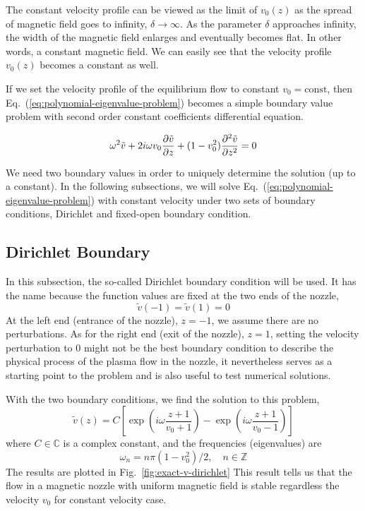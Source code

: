 The constant velocity profile can be viewed as the limit of $v_0(z)$ as the spread of magnetic field goes to infinity, $\delta\to\infty$. As the parameter $\delta$ approaches infinity, the width of the magnetic field enlarges and eventually becomes flat. In other words, a constant magnetic field. We can easily see that the velocity profile $v_0(z)$ becomes a constant as well.

If we set the velocity profile of the equilibrium flow to constant $v_0=\text{const}$, then Eq.~(\ref{eq:polynomial-eigenvalue-problem}) becomes a simple boundary value problem with second order constant coefficients differential equation.

\begin{equation} \label{eq:constant-v-problem-dirichlet}
	\omega^2\tilde{v} + 2i\omega v_0\pdv{\tilde{v}}{z} + (1-v_0^2)\pdv[2]{\tilde{v}}{z} = 0
\end{equation}

We need two boundary values in order to uniquely determine the solution (up to a constant). In the following subsections, we will solve Eq.~(\ref{eq:polynomial-eigenvalue-problem}) with constant velocity under two sets of boundary conditions, Dirichlet and fixed-open boundary condition.

\subsection{Dirichlet Boundary}
In this subsection, the so-called Dirichlet boundary condition will be used. It has the name because the function values are fixed at the two ends of the nozzle,
\begin{equation}
	\tilde{v}(-1) = \tilde{v}(1) = 0
\end{equation}
At the left end (entrance of the nozzle), $z=-1$, we assume there are no perturbations. As for the right end (exit of the nozzle), $z=1$, setting the velocity perturbation to 0 might not be the best boundary condition to describe the physical process of the plasma flow in the nozzle, it nevertheless serves as a starting point to the problem and is also useful to test numerical solutions.

With the two boundary conditions, we find the solution to this problem,
\begin{equation} \label{eq:constant-v-solution-dirichlet}
	\tilde{v}(z) = C\left[ \exp\left(i\omega\frac{z+1}{v_0+1}\right) - \exp\left(i\omega\frac{z+1}{v_0-1}\right) \right]
\end{equation}
where $C\in\mathbb{C}$ is a complex constant, and the frequencies (eigenvalues) are
\begin{equation}
	\omega_n = n\pi(1-v_0^2)/2,\quad n\in\mathbb{Z}
	\label{eq:eigvals-constant-v-dirichlet}
\end{equation}
The results are plotted in Fig.~\ref{fig:exact-v-dirichlet} This result tells us that the flow in a magnetic nozzle with uniform magnetic field is stable regardless the velocity $v_0$ for constant velocity case.

